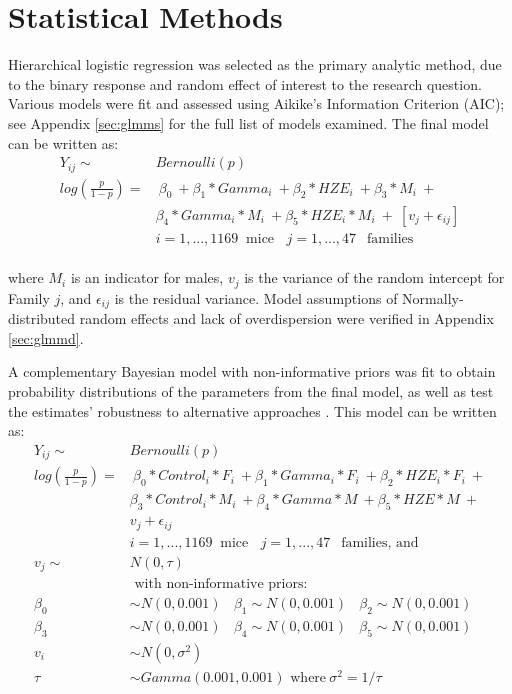 \documentclass[12pt]{article}
\begin{document}
\section{Statistical Methods}
\label{sec:methods}

Hierarchical logistic regression was selected as the primary analytic method, due to the binary response and random effect of interest to the research question. Various models were fit and assessed using Aikike's Information Criterion (AIC); see Appendix \ref{sec:glmms} for the full list of models examined. The final model can be written as:\\
\begin{equation}
\begin{aligned}
Y_{ij} \sim &Bernoulli(p) \\
log(\frac{p}{1-p}) = &\ \beta_0\ +\beta_1*Gamma_i\ + \beta_2*HZE_i\ + \beta_3*M_i\ + \\ &\beta_4*Gamma_i*M_i\ + \beta_5*HZE_i*M_i\ +\ [v_{j} + \epsilon_{ij}] \\
&i = 1, ..., 1169\ \mbox{ mice}\ \ \ \ j = 1,...,47\ \ \mbox{ families}
\end{aligned}
\label{eq:glmm}
\end{equation}\\
where \(M_i\) is an indicator for males, \(v_{j}\) is the variance of the random intercept for Family \(j\), and \(\epsilon_{ij}\) is the residual variance. Model assumptions of Normally-distributed random effects and lack of overdispersion were verified in Appendix \ref{sec:glmmd}.

A complementary Bayesian model with non-informative priors was fit to obtain probability distributions of the parameters from the final model, as well as test the estimates' robustness to alternative approaches \citep{BDA}. This model can be written as:\\
\begin{equation}
\begin{aligned}
Y_{ij} \sim &Bernoulli(p)\\
log(\frac{p}{1-p}) = &\ \beta_0*Control_i*F_i\ +\beta_1*Gamma_i*F_i\ + \beta_2*HZE_i*F_i\ + \\ &\beta_3*Control_i*M_i\ +\beta_4*Gamma*M\ + \beta_5*HZE*M\ + \\
&v_{j} + \epsilon_{ij}\\
&i = 1, ..., 1169\ \mbox{ mice}\ \ \ \ j = 1,...,47\ \ \mbox{ families, and} \\
v_j \sim\ &N(0, \tau)
\\
&\mbox{ with non-informative priors:}\\
\beta_0 &\sim N(0, 0.001)\ \ \ \ \beta_1 \sim N(0, 0.001)\ \ \ \ \beta_2 \sim N(0, 0.001)\\
\beta_3 &\sim N(0, 0.001)\ \ \ \ \beta_4 \sim N(0, 0.001)\ \ \ \ \beta_5 \sim N(0, 0.001)\\
v_i &\sim N(0, \sigma^2)\\
\tau &\sim Gamma(0.001, 0.001) \mbox{ where}\ \sigma^2 = 1/\tau 
\end{aligned}
\label{eq:bayes}
\end{equation}
\end{document}
